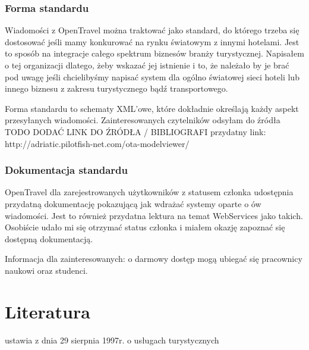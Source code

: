 \documentclass[a4paper,onecolumn,oneside,11pt,wide,floatssmall]{mwrep}
\theoremstyle{definition}
\theoremstyle{plain}%
\theoremstyle{remark}
\begin{document}
\subsubsection{Forma standardu}
Wiadomości z OpenTravel można traktować jako standard, do którego trzeba się
dostosować jeśli mamy konkurować na rynku światowym z innymi hotelami. Jest to
sposób na integracje całego spektrum biznesów branży turystycznej. Napisałem o
tej organizacji dlatego, żeby wskazać jej istnienie i to, że należało by je brać
pod uwagę jeśli chcielibyśmy napisać system dla ogólno światowej sieci hoteli
lub innego biznesu z zakresu turystycznego bądź transportowego.

Forma standardu to schematy XML'owe, które dokładnie określają każdy aspekt
przesyłanych wiadomości. Zainteresowanych czytelników odsyłam do źródła TODO
DODAĆ LINK DO ŹRÓDŁA / BIBLIOGRAFI
przydatny link: http://adriatic.pilotfish-net.com/ota-modelviewer/

\subsubsection{Dokumentacja standardu}
OpenTravel dla zarejestrowanych użytkowników z statusem członka udostępnia
przydatną dokumentację pokazującą jak wdrażać systemy oparte o ów wiadomości.
Jest to również przydatna lektura na temat WebServices jako takich. Osobiście
udało mi się otrzymać status członka i miałem okazję zapoznać się dostępną
dokumentacją.

Informacja dla zainteresowanych: o darmowy dostęp mogą ubiegać się pracownicy
naukowi oraz studenci.

\section{Literatura}

ustawia z dnia 29 sierpnia 1997r. o usługach turystycznych




\appendix


\nocite{*}


% 

\end{document}
